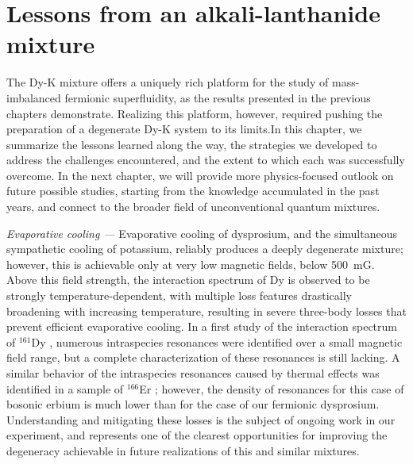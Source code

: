 \chapter{Lessons from an alkali-lanthanide mixture}
\label{Chpt:Summary}




The Dy-K mixture offers a uniquely rich platform for the study of mass-imbalanced fermionic superfluidity, as the results presented in the previous chapters demonstrate. Realizing this platform, however, required pushing the preparation of a degenerate Dy-K system to its limits.In this chapter, we summarize the lessons learned along the way, the strategies we developed to address the challenges encountered, and the extent to which each was successfully overcome. In the next chapter, we will provide more physics-focused outlook on future possible studies, starting from the knowledge accumulated in the past years, and connect to the broader field of unconventional quantum mixtures. 



\textit{Evaporative cooling ---} Evaporative cooling of dysprosium, and the simultaneous sympathetic cooling of potassium, reliably produces a deeply degenerate mixture; however, this is achievable only at very low magnetic fields, below \SI{500}{mG}. Above this field strength, the interaction spectrum of Dy is observed to be strongly temperature-dependent, with multiple loss features drastically broadening with increasing temperature, resulting in severe three-body losses that prevent efficient evaporative cooling. In a first study of the interaction spectrum of $^{161}$Dy \cite{Soave2022lff}, numerous intraspecies resonances were identified over a small magnetic field range, but a complete characterization of these resonances is still lacking. A similar behavior of the intraspecies resonances caused by thermal effects  was identified in a sample of $^{166}$Er \cite{Krstajic2025cot}; however, the density of resonances for this case of bosonic erbium is much lower than for the case of our fermionic dysprosium. Understanding and mitigating these losses is the subject of ongoing work in our experiment, and represents one of the clearest opportunities for improving the degeneracy achievable in future realizations of this and similar mixtures.

